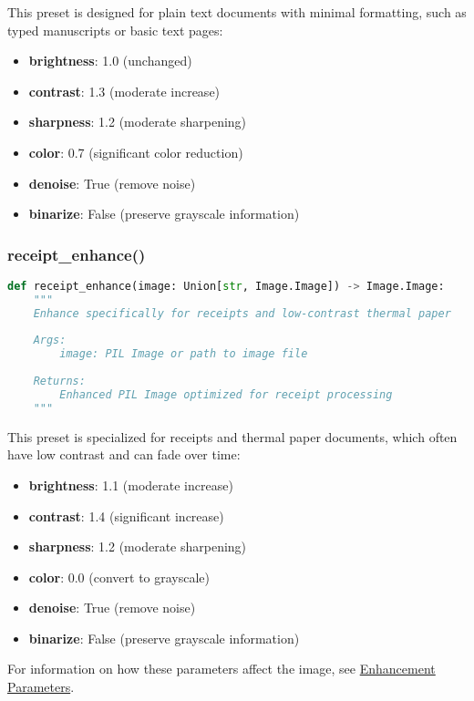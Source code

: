 This preset is designed for plain text documents with minimal formatting, such as typed manuscripts or basic text pages:

\begin{itemize}
    \item \textbf{brightness}: 1.0 (unchanged)
    \item \textbf{contrast}: 1.3 (moderate increase)
    \item \textbf{sharpness}: 1.2 (moderate sharpening)
    \item \textbf{color}: 0.7 (significant color reduction)
    \item \textbf{denoise}: True (remove noise)
    \item \textbf{binarize}: False (preserve grayscale information)
\end{itemize}

\subsubsection{receipt\_enhance()}
\begin{lstlisting}[language=Python, caption=Receipt Enhancement Function]
def receipt_enhance(image: Union[str, Image.Image]) -> Image.Image:
    """
    Enhance specifically for receipts and low-contrast thermal paper
    
    Args:
        image: PIL Image or path to image file
        
    Returns:
        Enhanced PIL Image optimized for receipt processing
    """
\end{lstlisting}

This preset is specialized for receipts and thermal paper documents, which often have low contrast and can fade over time:

\begin{itemize}
    \item \textbf{brightness}: 1.1 (moderate increase)
    \item \textbf{contrast}: 1.4 (significant increase)
    \item \textbf{sharpness}: 1.2 (moderate sharpening)
    \item \textbf{color}: 0.0 (convert to grayscale)
    \item \textbf{denoise}: True (remove noise)
    \item \textbf{binarize}: False (preserve grayscale information)
\end{itemize}

For information on how these parameters affect the image, see \hyperref[sec:parameters]{Enhancement Parameters}.

